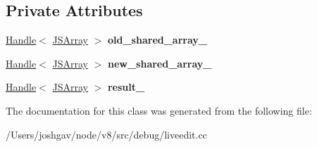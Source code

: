 \subsection*{Private Attributes}
\begin{DoxyCompactItemize}
\item 
\hyperlink{classv8_1_1internal_1_1_handle}{Handle}$<$ \hyperlink{classv8_1_1internal_1_1_j_s_array}{J\+S\+Array} $>$ {\bfseries old\+\_\+shared\+\_\+array\+\_\+}\hypertarget{classv8_1_1internal_1_1_multiple_function_target_ac5dbbbfefff77d7edbf4780e520fffa9}{}\label{classv8_1_1internal_1_1_multiple_function_target_ac5dbbbfefff77d7edbf4780e520fffa9}

\item 
\hyperlink{classv8_1_1internal_1_1_handle}{Handle}$<$ \hyperlink{classv8_1_1internal_1_1_j_s_array}{J\+S\+Array} $>$ {\bfseries new\+\_\+shared\+\_\+array\+\_\+}\hypertarget{classv8_1_1internal_1_1_multiple_function_target_a68990b1005bff030ce3e1251c07e72a9}{}\label{classv8_1_1internal_1_1_multiple_function_target_a68990b1005bff030ce3e1251c07e72a9}

\item 
\hyperlink{classv8_1_1internal_1_1_handle}{Handle}$<$ \hyperlink{classv8_1_1internal_1_1_j_s_array}{J\+S\+Array} $>$ {\bfseries result\+\_\+}\hypertarget{classv8_1_1internal_1_1_multiple_function_target_afc08dc3932e8ef45f11565f541b1c378}{}\label{classv8_1_1internal_1_1_multiple_function_target_afc08dc3932e8ef45f11565f541b1c378}

\end{DoxyCompactItemize}


The documentation for this class was generated from the following file\+:\begin{DoxyCompactItemize}
\item 
/\+Users/joshgav/node/v8/src/debug/liveedit.\+cc\end{DoxyCompactItemize}
